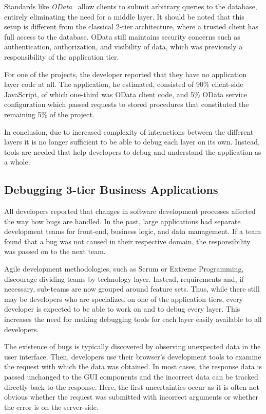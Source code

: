 \documentclass[
      english,
			conference,
      ]{IEEEtran}
\begin{document}
Standards like \emph{OData}~\cite{chappell_introducing_2011} allow clients to submit arbitrary queries to the database, entirely eliminating the need for a middle layer.
It should be noted that this setup is different from the classical 2-tier architecture, where a trusted client has full access to the database.
OData still maintains security concerns such as authentication, authorization, and visibility of data, which was previously a responsibility of the application tier.

For one of the projects, the developer reported that they have no application layer code at all.
The application, he estimated, consisted of 90\% client-side JavaScript, of which one-third was OData client code, and 5\% OData service configuration which passed requests to stored procedures that constituted the remaining 5\% of the project.

In conclusion, due to increased complexity of interactions between the different layers it is no longer sufficient to be able to debug each layer on its own.
Instead, tools are needed that help developers to debug and understand the application as a whole.

\subsection{Debugging 3-tier Business Applications}

All developers reported that changes in software development processes affected the way how bugs are handled.
In the past, large applications had separate development teams for front-end, business logic, and data management.
If a team found that a bug was not caused in their respective domain, the responsibility was passed on to the next team.

Agile development methodologies, such as Scrum or Extreme Programming, discourage dividing teams by technology layer.
Instead, requirements and, if necessary, sub-teams are now grouped around feature sets.
Thus, while there still may be developers who are specialized on one of the application tiers, every developer is expected to be able to work on and to debug every layer.
This increases the need for making debugging tools for each layer easily available to all developers.

The existence of bugs is typically discovered by observing unexpected data in the user interface.
Then, developers use their browser's development tools to examine the request with which the data was obtained.
In most cases, the response data is passed unchanged to the GUI components and the incorrect data can be tracked directly back to the response.
Here, the first uncertainties occur as it is often not obvious whether the request was submitted with incorrect arguments or whether the error is on the server-side.
\end{document}
